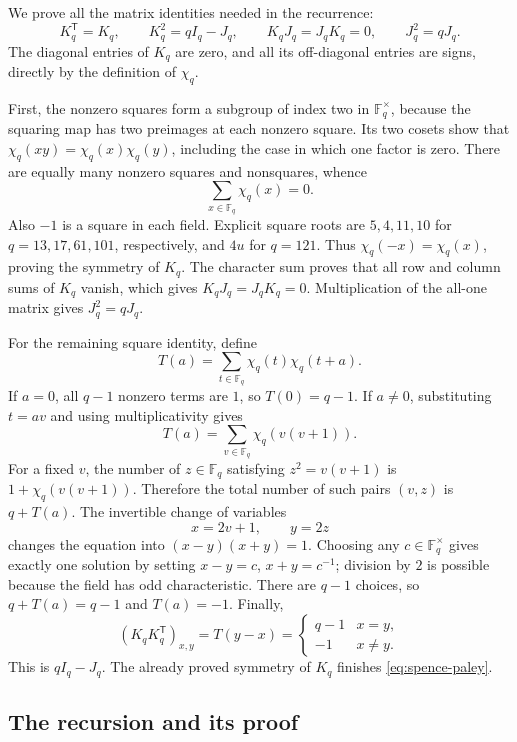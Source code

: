 \documentclass[10pt]{article}
\begin{document}
We prove all the matrix identities needed in the recurrence:
\begin{equation}\label{eq:spence-paley}
 K_q^{\mathsf T}=K_q,\qquad
 K_q^2=qI_q-J_q,\qquad
 K_qJ_q=J_qK_q=0,\qquad J_q^2=qJ_q.
\end{equation}
The diagonal entries of $K_q$ are zero, and all its off-diagonal entries
are signs, directly by the definition of $\chi_q$.

First, the nonzero squares form a subgroup of index two in
$\mathbb F_q^\times$, because the squaring map has two preimages at each
nonzero square. Its two cosets show that $\chi_q(xy)=\chi_q(x)\chi_q(y)$,
including the case in which one factor is zero. There are equally many
nonzero squares and nonsquares, whence
\[
 \sum_{x\in\mathbb F_q}\chi_q(x)=0.
\]
Also $-1$ is a square in each field. Explicit square roots are
$5,4,11,10$ for $q=13,17,61,101$, respectively, and $4u$ for $q=121$.
Thus $\chi_q(-x)=\chi_q(x)$, proving the symmetry of $K_q$. The character
sum proves that all row and column sums of $K_q$ vanish, which gives
$K_qJ_q=J_qK_q=0$. Multiplication of the all-one matrix gives
$J_q^2=qJ_q$.

For the remaining square identity, define
\[
 T(a)=\sum_{t\in\mathbb F_q}\chi_q(t)\chi_q(t+a).
\]
If $a=0$, all $q-1$ nonzero terms are $1$, so $T(0)=q-1$.
If $a\ne0$, substituting $t=av$ and using multiplicativity gives
\[
 T(a)=\sum_{v\in\mathbb F_q}\chi_q(v(v+1)).
\]
For a fixed $v$, the number of $z\in\mathbb F_q$ satisfying
$z^2=v(v+1)$ is $1+\chi_q(v(v+1))$. Therefore the total number of such
pairs $(v,z)$ is $q+T(a)$. The invertible change of variables
\[
 x=2v+1,\qquad y=2z
\]
changes the equation into $(x-y)(x+y)=1$. Choosing any
$c\in\mathbb F_q^\times$ gives exactly one solution by setting
$x-y=c$, $x+y=c^{-1}$; division by $2$ is possible because the field has
odd characteristic. There are $q-1$ choices, so $q+T(a)=q-1$ and
$T(a)=-1$. Finally,
\[
 (K_qK_q^{\mathsf T})_{x,y}=T(y-x)
 =\begin{cases}q-1&x=y,\\-1&x\ne y.\end{cases}
\]
This is $qI_q-J_q$. The already proved symmetry of $K_q$ finishes
\eqref{eq:spence-paley}.

\subsection{The recursion and its proof}
\end{document}
